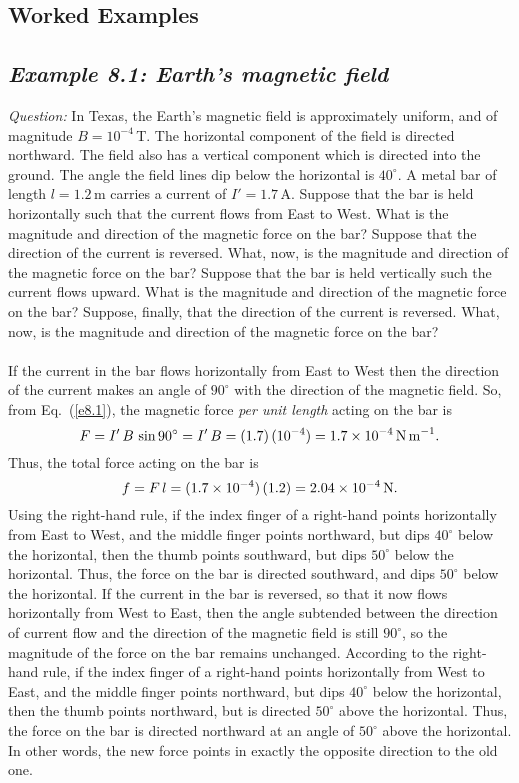 \subsection{Worked Examples}
\subsection*{\em Example 8.1: Earth's magnetic field}
\begin{figure*}[h]
\epsfysize=2.5in
\centerline{}
\end{figure*}
{\em Question:}  In Texas, the
Earth's magnetic field is approximately uniform, and of magnitude
$B=10^{-4}$\,T. The horizontal component of the field is directed northward.
The field also has a vertical component which is directed into the ground. The
angle the field lines dip below the horizontal is $40^\circ$. A metal
bar of length $l=1.2$\,m carries a current of $I'=1.7$\,A. Suppose that the
bar is held horizontally such that the current flows from
East to West. What is the magnitude and direction of the magnetic
force on the bar? Suppose that the direction of the current is reversed.
What, now, 
is the magnitude and direction of the magnetic
force on the bar? Suppose that the bar is held vertically such the current
flows upward. What 
is the magnitude and direction of the magnetic
force on the bar? Suppose, finally, that the direction of the current is
reversed. What, now, is the magnitude and direction of the magnetic
force on the bar?\\
~\\
 If the current in the bar flows horizontally
from East to West then the direction
of the current makes an angle of $90^\circ$ with the direction of the
magnetic field. So, from Eq.~(\ref{e8.1}), the magnetic  force {\em per unit length}
acting on the bar is
$$
F = I'\,B\,\sin 90^\circ = I'\,B = (1.7)\, (10^{-4})= 1.7\times 10^{-4}\,{\rm N\,m}^{-1}.
$$
Thus, the total force acting on the bar
is
$$
f = F\,l = (1.7\times 10^{-4})\,(1.2) = 2.04\times 10^{-4}\,{\rm N}.
$$
Using the right-hand rule, if the  index finger of a right-hand points horizontally from
East to West, and the middle finger points northward, but dips $40^\circ$ below
the horizontal, then the thumb points southward, but dips $50^\circ$ below
the horizontal. Thus, the force on the bar is directed southward, and
dips $50^\circ$ below
the horizontal.
If the current in the bar is reversed, so that it now flows horizontally from West to
East, then the angle subtended between the direction of current flow and
the direction of the magnetic field is still $90^\circ$, so the magnitude
of the force on the bar remains unchanged. According to the right-hand rule,
if the index finger of a right-hand   points horizontally from
West to East,  and the middle finger points northward, but dips $40^\circ$ below
the horizontal, then the thumb points northward, but is directed $50^\circ$ above
the horizontal.  Thus, the force on the bar is directed northward at an angle of
$50^\circ$ above
the horizontal. In other words, the new force points in exactly the opposite
direction to the old one. 

